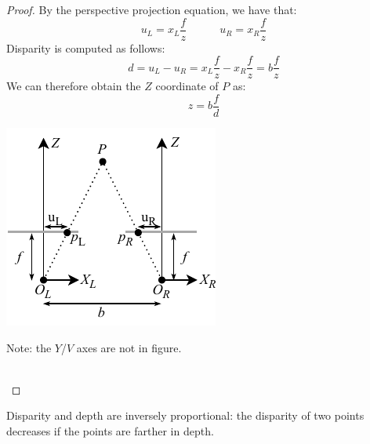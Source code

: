 \begin{description}
\begin{theorem}
\begin{proof}
\begin{minipage}{0.6\textwidth}
                    By the perspective projection equation, we have that:
                    \[ u_L = x_L\frac{f}{z} \hspace{3em} u_R = x_R\frac{f}{z} \]
                    Disparity is computed as follows:
                    \[ d = u_L - u_R = x_L\frac{f}{z} - x_R\frac{f}{z} = b\frac{f}{z} \]
                    We can therefore obtain the $Z$ coordinate of $P$ as:
                    \[ z = b\frac{f}{d} \]
                \end{minipage}
                \begin{minipage}{0.3\textwidth}
                    \begin{center}
                        \includegraphics[width=\textwidth]{./img/_standard_stereo_geometry.pdf}
                    \end{center}
                    Note: the $Y$/$V$ axes are not in figure.
                \end{minipage}\\
            \end{proof}

            \begin{remark}
                Disparity and depth are inversely proportional:
                the disparity of two points decreases if the points are farther in depth.
            \end{remark}
        \end{theorem}


\end{description}
